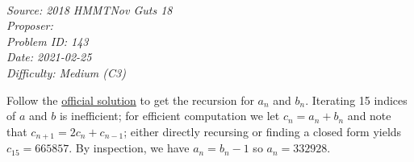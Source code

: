 \SSbreak\\
\emph{Source: 2018 HMMTNov Guts 18}\\
\emph{Proposer: \Paiya}\\ %
\emph{Problem ID: 143}\\
\emph{Date: 2021-02-25}\\
\emph{Difficulty: Medium (C3)}\\
\SSbreak

\bigskip

\begin{solution}\hfil\medskip
	
    Follow the \href{https://hmmt-archive.s3.amazonaws.com/tournaments/2018/nov/guts/solutions.pdf}{official solution} to get the recursion for $a_n$ and $b_n$.
    Iterating 15 indices of $a$ and $b$ is inefficient; for efficient computation we let $c_n = a_n + b_n$ and note that $c_{n + 1} = 2c_n + c_{n - 1}$; either directly recursing or finding a closed form yields 
    $c_{15} = 665857$. By inspection, we have $a_n = b_n - 1$ so $a_n = \boxed{332928}$.
\end{solution}\bigskip
